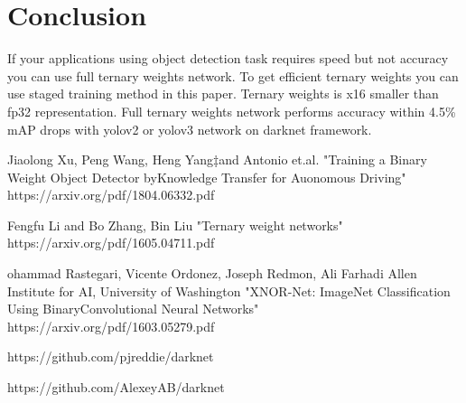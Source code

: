 \documentclass[twocolumn]{article}
\begin{document}
\section{Conclusion}

If your applications using object detection task requires speed but not accuracy you can use full ternary weights network.
To get efficient ternary weights you can use staged training method in this paper.
Ternary weights is x16 smaller than fp32 representation.
Full ternary weights network performs accuracy within 4.5\% mAP drops with yolov2 or yolov3 network on darknet framework.

\begin{thebibliography}{99}
 \item Jiaolong Xu, Peng Wang, Heng Yang‡and Antonio et.al.
 "Training a Binary Weight Object Detector byKnowledge Transfer for Auonomous Driving" https://arxiv.org/pdf/1804.06332.pdf
 \item Fengfu Li and Bo Zhang, Bin Liu "Ternary weight networks" https://arxiv.org/pdf/1605.04711.pdf
 \item ohammad Rastegari, Vicente Ordonez, Joseph Redmon, Ali Farhadi Allen Institute for AI, University of Washington
 "XNOR-Net: ImageNet Classification Using BinaryConvolutional Neural Networks" https://arxiv.org/pdf/1603.05279.pdf
 \item https://github.com/pjreddie/darknet
 \item https://github.com/AlexeyAB/darknet

\end{thebibliography}
\end{document}
